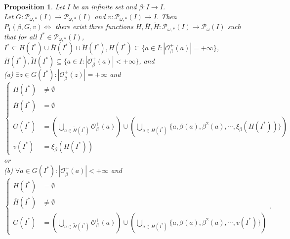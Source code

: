 \documentclass[a4paper,11pt]{article}
\theoremstyle{plain}
\newtheorem{proposition}{Proposition}[section]
\theoremstyle{definition}
\theoremstyle{remark}
\begin{document}
\begin{proposition}
\label{propP1}
Let $I$ be an infinite set and $\beta : I \to I$. \\
Let $G : \mathcal{P}_{\omega,*}(I) \to \mathcal{P}_{\omega,*}(I)$ and $v : \mathcal{P}_{\omega,*}(I) \to I$. Then \\
$P_1(\beta,G,v) \Leftrightarrow$ there exist three functions $H,\overline{H}, \widetilde{H} : \mathcal{P}_{\omega,*}(I) \to \mathcal{P}_{\omega}(I)$ such that for all $I^* \in \mathcal{P}_{\omega,*}(I)$,  $I^* \subseteq H(I^*) \cup \overline{H}(I^*) \cup \widetilde{H}(I^*), H(I^*) \subseteq \{a \in I : |\mathcal{O}^{+}_\beta(a)| = +\infty\}$, $\overline{H}(I^*), \widetilde{H}(I^*) \subseteq \{a \in I : |\mathcal{O}^{+}_\beta(a)| < +\infty\}$, and \\
(a) $\exists z \in G(I^*) : |\mathcal{O}^{+}_\beta(z)| = +\infty$ and \\
\[ \begin{cases} H(I^*) &\neq \emptyset \\ \overline{H}(I^*) &= \emptyset \\ G(I^*) &= \left( \bigcup_{a \in \widetilde{H}(I^*)} \mathcal{O}^{+}_\beta(a) \right) \cup \left( \bigcup_{a \in H(I^*)} \{a, \beta(a), \beta^2(a), \cdots, \xi_\beta(H(I^*))\} \right) \\ v(I^*) &= \xi_\beta(H(I^*)) \end{cases} \] 
or \\
(b) $\forall a \in G(I^*) : |\mathcal{O}^{+}_\beta(a)|<+\infty$ and
\[ \begin{cases} H(I^*) &= \emptyset \\ \overline{H}(I^*) &\neq \emptyset \\ G(I^*) &= \left( \bigcup_{a \in \widetilde{H}(I^*)} \mathcal{O}^{+}_\beta(a) \right) \cup \left( \bigcup_{a \in \overline{H}(I^*)} \{a, \beta(a), \beta^2(a), \cdots, v(I^*)\} \right) \end{cases}. \] 
\end{proposition}
\end{document}
